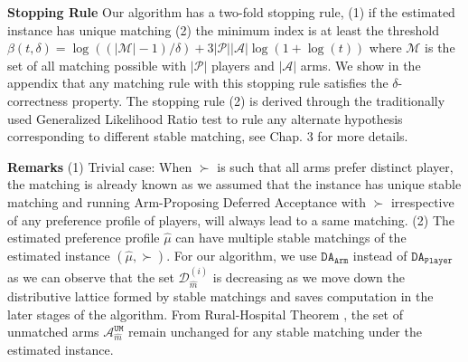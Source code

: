 \documentclass{article}
\newcommand{\UMA}{\mathcal{A}^{\texttt{UM}}}
\begin{document}
\textbf{Stopping Rule}  Our algorithm has a two-fold stopping rule, (1) if the estimated instance has unique matching (2) the minimum index is at least the threshold $\beta(t,\delta) = \log((|\mathcal{M}|-1)/\delta)+3|\mathcal{P}||\mathcal{A}|\log(1+\log(t))$ where $\mathcal{M}$ is the set of all matching possible with $|\mathcal{P}|$ players and $|\mathcal{A}|$ arms. We show in the appendix that any matching rule with this stopping rule satisfies the $\delta$-correctness property. The stopping rule (2) is derived through the traditionally used Generalized Likelihood Ratio test to rule any alternate hypothesis corresponding to different stable matching, see Chap. 3 \cite{kaufmann2020contributions} for more details.

\textbf{Remarks} (1)  Trivial case: When $\succ$ is such that all arms prefer distinct player, the matching is already known as we assumed that the instance has unique stable matching and running Arm-Proposing Deferred Acceptance with $\succ$ irrespective of any preference profile of players, will always lead to a same matching. (2) The estimated preference profile $\hat{\mu}$ can have multiple stable matchings of the estimated instance $(\hat{\mu},\succ)$. For our algorithm, we use $\texttt{DA}_{\texttt{Arm}}$ instead of $\texttt{DA}_{\texttt{Player}}$ as we can observe that the set $\mathcal{D}_{\hat{m}}^{(i)}$ is decreasing as we move down the distributive lattice formed by stable matchings \cite{Echenique_Immorlica_Vazirani_2023} and saves computation in the later stages of the algorithm. From Rural-Hospital Theorem \cite{Echenique_Immorlica_Vazirani_2023}, the set of unmatched arms $\UMA_{\hat{m}}$ remain unchanged for any stable matching  under the estimated instance.
\end{document}
